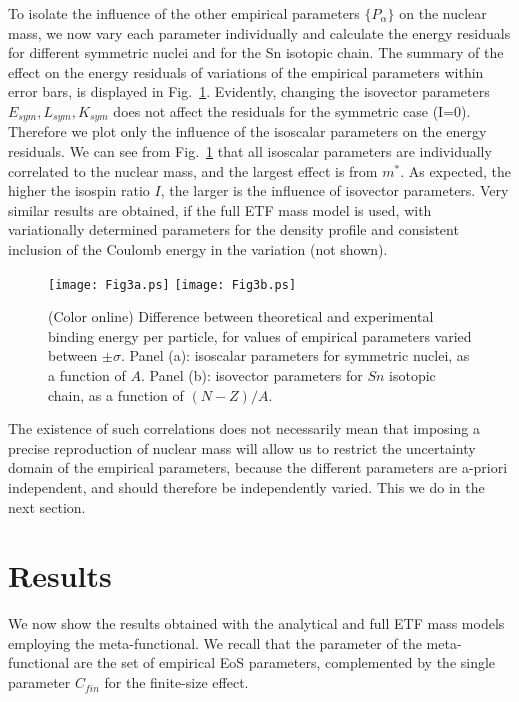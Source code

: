 \documentclass
[aps,prc,twocolumn,showpacs,showkeys,amsmath,floatfix,superscriptaddress]{revtex4}
\begin{document}
{{To isolate the influence of the other empirical parameters $ \{P_\alpha\}$ on the nuclear mass, we now vary each parameter individually %
and calculate the energy residuals for different symmetric nuclei and for the Sn isotopic chain. 
The summary of the effect on the energy residuals of variations of the empirical parameters within error bars,
is displayed in Fig.~\ref{fig:aabdiff_sig}.
Evidently, changing the isovector parameters $E_{sym},L_{sym},K_{sym}$ does not affect the residuals for the symmetric case (I=0). Therefore we plot only the influence of the isoscalar parameters on the energy residuals.%
 We can see from Fig.~\ref{fig:aabdiff_sig} that all isoscalar parameters are individually correlated to the nuclear mass, and the largest effect is from $m^*$. As expected, the higher the isospin ratio $I$, the larger is the influence of isovector parameters. 
Very similar results are obtained, if the full ETF mass model is used, with variationally determined parameters for the density profile and consistent inclusion of the Coulomb energy in the variation (not shown).

 
\begin{figure}[htbp]
    \begin{center}
\texttt{[image: Fig3a.ps]}
\texttt{[image: Fig3b.ps]}
      \caption{(Color online) Difference between theoretical and experimental binding energy per particle, for values of
      empirical parameters varied between $\pm \sigma$. 
      Panel (a): isoscalar parameters for symmetric nuclei, as a function of $A$. 
      Panel (b): isovector parameters for $Sn$ isotopic chain, as a function of $(N-Z)/A$.  
      }\label{fig:aabdiff_sig}
      \end{center}
\end{figure}


The existence of such correlations does not necessarily mean that imposing a precise reproduction of nuclear mass will allow us to restrict the uncertainty domain of the empirical parameters, because the different parameters are a-priori independent, and should therefore be independently varied. This we do in the next section.

\section{Results}

We now show the results obtained with the analytical and full ETF mass models employing the meta-functional. We recall that the parameter of the meta-functional are the set of empirical EoS parameters, complemented by the single parameter $C_{fin}$ for the finite-size effect.

}}
\end{document}
